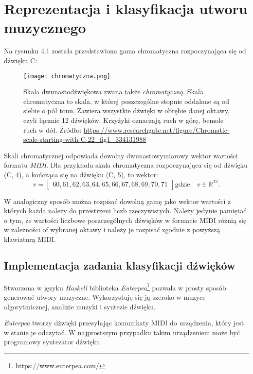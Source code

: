 \chapter{Reprezentacja i klasyfikacja utworu muzycznego}

Na rysunku 4.1 została przedstawiona gama chromatyczna rozpoczynająca się od dźwięku C:
\begin{figure}[H]
\texttt{[image: chromatyczna.png]}
\centering
\caption{Skala dwunastodźwiękowa zwana także  \textit{chromatyczną}. Skala chromatyczna to skala, w której poszczególne stopnie oddalone są od siebie o pół tonu. Zawiera wszystkie dźwięki w obrębie danej oktawy, czyli łącznie 12 dźwięków. Krzyżyki oznaczają ruch w górę, bemole ruch w dół. Źródło: \url{https://www.researchgate.net/figure/Chromatic-scale-starting-with-C-22_fig1_334131988}}
\centering
\end{figure}
Skali chromatycznej odpowiada dowolny dwunastowymiarowy wektor wartości formatu \textit{MIDI}. Dla przykładu skala chromatyczna rozpoczynająca się od dźwięku (C, 4), a kończąca się na dźwięku (C, 5), to wektor:
\begin{equation*}
v =
\begin{bmatrix}
60,61,62,63,64,65,66,67,68,69,70,71
\end{bmatrix}
\text{gdzie} \quad v \in \mathbb{R}^{12}.
\end{equation*}

W analogiczny sposób można rozpisać dowolną gamę jako wektor wartości z których każda należy do przestrzeni liczb rzeczywistych. Należy jedynie pamiętać o tym, że wartości liczbowe poszczególnych dźwięków w formacie MIDI różnią się  w zależności of wybranej oktawy i należy je rozpisać zgodnie z powyższą klawiaturą MIDI.



\section{Implementacja zadania klasyfikacji dźwięków}

Stworzona w języku \textit{Haskell} biblioteka \textit{Euterpea}\footnote{https://www.euterpea.com/} pozwala w prosty sposób generować utwory muzyczne. Wykorzystuję się ją szeroko w muzyce algorytmicznej, analizie muzyki i syntezie dźwięku.

\textit{Euterpea} tworzy dźwięki przesyłając komunikaty MIDI do urządzenia, który jest w stanie je odczytać. W najprostszym przypadku takim urządzeniem może być programowy syntezator dźwięku \citep{Obrebski2020}


